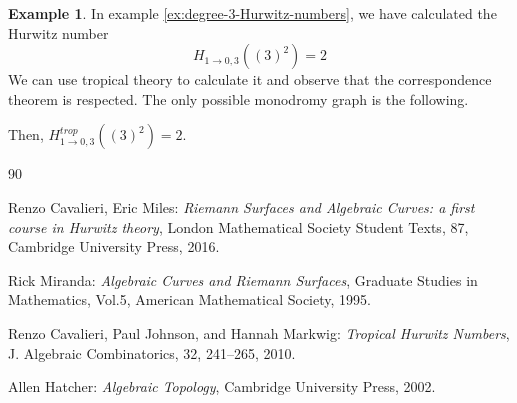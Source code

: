 \documentclass[12pt,a4paper,openright,twoside]{report}
\theoremstyle{definition} %
\newtheorem{example}[theorem]{Example}
\renewcommand{\chaptermark}[1]{\markboth{\thechapter.\ #1}{}}
\begin{document}
\begin{example}
    In example \ref{ex:degree-3-Hurwitz-numbers}, we have calculated the Hurwitz number
    \[
    H_{1 \to 0,3}((3)^2) = 2
    \]
    We can use tropical theory to calculate it and observe that the correspondence theorem is respected. The only possible monodromy graph is the following.

    \begin{table}[h]
    \centering
    \end{table}

    Then, \(H^{trop}_{1 \to 0,3}((3)^2) = 2\).
    
\end{example}


\clearpage{\pagestyle{empty}\cleardoublepage}
\renewcommand{\chaptermark}[1]{\markright{\thechapter \ #1}{}}
\lhead[\fancyplain{}{\bfseries\thepage}]{\fancyplain{}{\bfseries\rightmark}}


\begin{thebibliography}{90}
	\rhead[\fancyplain{}{\bfseries \leftmark}]{\fancyplain{}{\bfseries
			\thepage}}






     Renzo Cavalieri, Eric Miles: \textit{Riemann Surfaces and Algebraic Curves: a first course in Hurwitz theory}, London Mathematical Society Student Texts, 87, Cambridge University Press, 2016.

     Rick Miranda: \textit{Algebraic Curves and Riemann Surfaces}, Graduate Studies in Mathematics, Vol.5, American Mathematical Society, 1995.

     Renzo Cavalieri, Paul Johnson, and Hannah Markwig:
     \textit{Tropical Hurwitz Numbers},
     J. Algebraic Combinatorics, 32, 241--265, 2010.

      Allen Hatcher: \textit{Algebraic Topology}, Cambridge University Press, 2002.

\end{thebibliography}

\thispagestyle{empty}
\end{document}
